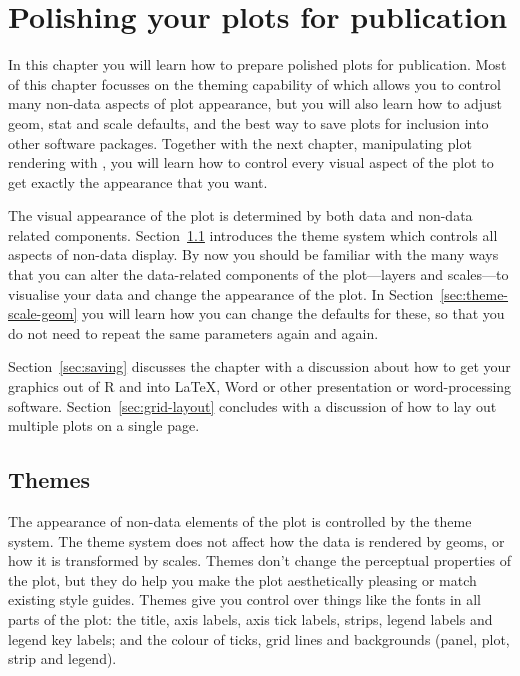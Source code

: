 

% 


\chapter{Polishing your plots for publication}
\label{cha:polishing}

In this chapter you will learn how to prepare polished plots for publication.  Most of this chapter focusses on the theming capability of \ggplot which allows you to control many non-data aspects of plot appearance, but you will also learn how to adjust geom, stat and scale defaults, and the best way to save plots for inclusion into other software packages.  Together with the next chapter, manipulating plot rendering with , you will learn how to control every visual aspect of the plot to get exactly the appearance that you want.

The visual appearance of the plot is determined by both data and non-data related components.  Section~\ref{sec:themes} introduces the theme system which controls all aspects of non-data display.  By now you should be familiar with the many ways that you can alter the data-related components of the plot---layers and scales---to visualise your data and change the appearance of the plot.  In Section~\ref{sec:theme-scale-geom} you will learn how you can change the defaults for these, so that you do not need to repeat the same parameters again and again.

Section~\ref{sec:saving} discusses the chapter with a discussion about how to get your graphics out of R and into \LaTeX, Word or other presentation or word-processing software.  Section~\ref{sec:grid-layout} concludes with a discussion of how to lay out multiple plots on a single page.


\section{Themes} 
\label{sec:themes}

The appearance of non-data elements of the plot is controlled by the theme system. The theme system does not affect how the data is rendered by geoms, or how it is transformed by scales. Themes don't change the perceptual properties of the plot, but they do help you make the plot aesthetically pleasing or match existing style guides. Themes give you control over things like the fonts in all parts of the plot: the title, axis labels, axis tick labels, strips, legend labels and legend key labels; and the colour of ticks, grid lines and backgrounds (panel, plot, strip and legend).

